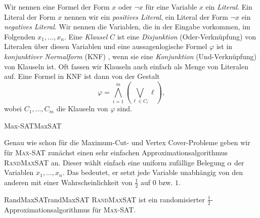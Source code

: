 \documentclass[language=ngerman,algolist]{TemplateLecture}
\begin{document}
Wir nennen eine Formel der Form $x$ oder $\neg x$ für eine Variable $x$ ein \emph{Literal}. Ein Literal der Form $x$ nennen wir ein \emph{positives Literal}, ein Literal der Form $\neg x$ ein \emph{negatives Literal}. Wir nennen die Variablen, die in der Eingabe vorkommen, im Folgenden $x_1, \ldots, x_n$. Eine \emph{Klausel} $C$ ist eine \emph{Disjunktion} (Oder-Verknüpfung) von Literalen über diesen Variablen und eine aussagenlogische Formel $\varphi$ ist in \emph{konjunktiver Normalform} (KNF) , wenn sie eine \emph{Konjunktion} (Und-Verknüpfung) von Klauseln ist. Oft fassen wir Klauseln auch einfach als Menge von Literalen auf. Eine Formel in KNF ist dann von der Gestalt 
\begin{equation*}
    \varphi = \bigwedge_{i=1}^m \left( \bigvee_{\ell \in C_l} \ell \right),
\end{equation*}
wobei $C_1, \ldots, C_m$ die Klauseln von $\varphi$ sind.

\begin{prob}{Max-SAT}{MaxSAT}
\end{prob}

Genau wie schon für die Maximum-Cut- und  Vertex Cover-Probleme geben wir für \textsc{Max-SAT} zunächst einen sehr einfachen Approximationsalgorithmus \textsc{RandMaxSAT} an. Dieser wählt einfach eine uniform zufällige Belegung $\alpha$ der Variablen $x_1, \ldots, x_n$. Das bedeutet, er setzt jede Variable unabhängig von den anderen mit einer Wahrscheinlichkeit von $\frac{1}{2}$ auf $0$ bzw. $1$.

\begin{thm}{RandMaxSAT}{randMaxSAT}
    \textsc{RandMaxSAT} ist ein randomisierter $\frac{1}{2}$-Approximationsalgorithmus für \textsc{Max-SAT}.
\end{thm}
\end{document}
